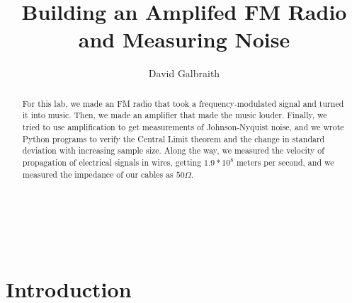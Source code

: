 \documentclass[11pt]{article}
\begin{document}
\title{Building an Amplifed FM Radio and Measuring Noise}
\author{David Galbraith}
\maketitle



\normalsize
\begin{abstract}
For this lab, we made an FM radio that took a frequency-modulated signal and turned it
into music. Then, we made an amplifier that made the music louder. Finally, we tried to use
amplification to get measurements of Johnson-Nyquist noise, and we wrote Python programs
to verify the Central Limit theorem and the change in standard deviation with
increasing sample size. Along the way, we measured the velocity of propagation of 
electrical signals in wires, getting $1.9*10^8$ meters per second, and we measured the impedance
of our cables as $50 \Omega$. 
\end{abstract}


\medskip                        %

\thispagestyle{plain}
 

\section{Introduction}
\end{document}
